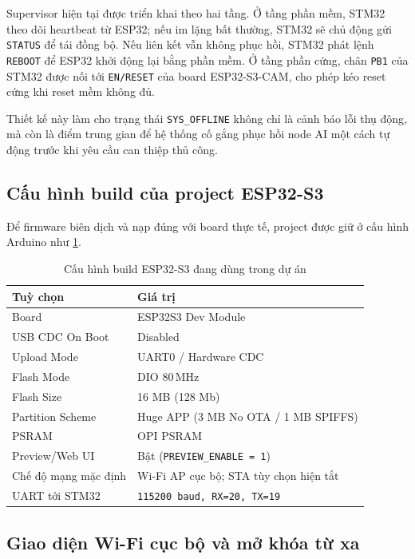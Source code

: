 Supervisor hiện tại được triển khai theo hai tầng. Ở tầng phần mềm, STM32 theo dõi heartbeat từ ESP32; nếu im lặng bất thường, STM32 sẽ chủ động gửi \texttt{STATUS} để tái đồng bộ. Nếu liên kết vẫn không phục hồi, STM32 phát lệnh \texttt{REBOOT} để ESP32 khởi động lại bằng phần mềm. Ở tầng phần cứng, chân \texttt{PB1} của STM32 được nối tới \texttt{EN/RESET} của board ESP32-S3-CAM, cho phép kéo reset cứng khi reset mềm không đủ.

Thiết kế này làm cho trạng thái \texttt{SYS\_OFFLINE} không chỉ là cảnh báo lỗi thụ động, mà còn là điểm trung gian để hệ thống cố gắng phục hồi node AI một cách tự động trước khi yêu cầu can thiệp thủ công.

\subsection{Cấu hình build của project ESP32-S3}

Để firmware biên dịch và nạp đúng với board thực tế, project được giữ ở cấu hình Arduino như \cref{tab:esp32_build_cfg}.

\begin{table}[H]
  \centering
  \caption{Cấu hình build ESP32-S3 đang dùng trong dự án}
  \label{tab:esp32_build_cfg}
  \begin{tabularx}{0.9\textwidth}{l X}
    \toprule
    \textbf{Tuỳ chọn} & \textbf{Giá trị} \\
    \midrule
    Board & ESP32S3 Dev Module \\
    USB CDC On Boot & Disabled \\
    Upload Mode & UART0 / Hardware CDC \\
    Flash Mode & DIO 80\,MHz \\
    Flash Size & 16 MB (128 Mb) \\
    Partition Scheme & Huge APP (3 MB No OTA / 1 MB SPIFFS) \\
    PSRAM & OPI PSRAM \\
    Preview/Web UI & Bật (\texttt{PREVIEW\_ENABLE = 1}) \\
    Chế độ mạng mặc định & Wi-Fi AP cục bộ; STA tùy chọn hiện tắt \\
    UART tới STM32 & \texttt{115200 baud, RX=20, TX=19} \\
    \bottomrule
  \end{tabularx}
\end{table}

\subsection{Giao diện Wi-Fi cục bộ và mở khóa từ xa}

